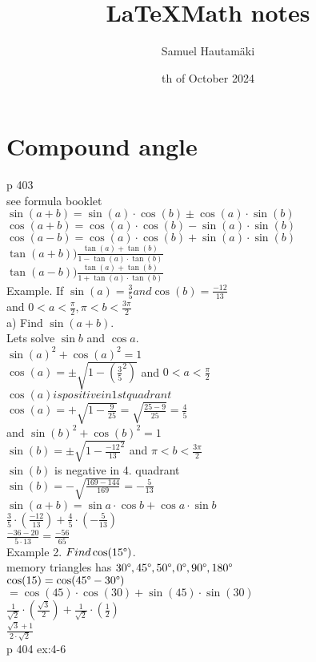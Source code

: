\documentclass{article}
\title{\LaTeX Math notes}
\author{Samuel Hautamäki}
\date{th of October 2024}
\begin{document}
  \maketitle
   
  \section{Compound angle}
  p 403\\
  see formula booklet\\
  $\sin (a+b)=\sin (a)\cdot\cos (b)\pm\cos(a)\cdot\sin(b)$\\
  $\cos (a+b)=\cos (a)\cdot\cos(b)-\sin(a)\cdot\sin(b)$\\
  $\cos (a-b)=\cos (a)\cdot\cos(b)+\sin(a)\cdot\sin(b)$\\
  $\tan(a+b)) \frac{\tan(a)+\tan(b)}{1-\tan(a)\cdot\tan(b)}$\\
  $\tan(a-b)) \frac{\tan(a)+\tan(b)}{1+\tan(a)\cdot\tan(b)}$\\
  Example. If $\sin(a)=\frac{3}{5} and \cos(b)=\frac{-12}{13}$\\
  and $0<a<\frac{\pi}{2},\pi<b<\frac{3\pi}{2}$\\
  a) Find $\sin(a+b)$.\\
  Lets solve $\sin b$ and $\cos a$.\\
  $\sin(a)^2+\cos(a)^2=1$\\
  $\cos(a)=\pm\sqrt{1-(\frac{3}{5}^2)}$ and $0<a<\frac{\pi}{2}$\\
  $\cos(a) is positive in 1st quadrant$\\
  $\cos(a)=+\sqrt{1-\frac{9}{25}}=\sqrt{\frac{25-9}{25}}=\frac{4}{5}$\\
  and $\sin(b)^2+\cos(b)^2=1$\\
  $\sin(b)=\pm\sqrt{1-\frac{-12}{13}^2}$ and $\pi<b<\frac{3\pi}{2}$\\
  $\sin(b)$ is negative in 4. quadrant\\
  $\sin(b)=-\sqrt{\frac{169-144}{169}}=-\frac{5}{13}$\\
  $\sin(a+b)=\sin a\cdot\cos b+\cos a\cdot\sin b$\\
  $\frac{3}{5}\cdot(\frac{-12}{13})+\frac{4}{5}\cdot(-\frac{5}{13})$\\
  $\frac{-36-20}{5\cdot13}=\frac{-56}{65}$\\
  Example 2. $Find \cos(15\degree)$.\\
  memory triangles has $30\degree,45\degree,50\degree,0\degree,90\degree,180\degree$\\
  $\cos(15)=\cos(45\degree-30\degree)$\\
  $=\cos(45)\cdot\cos(30)+\sin(45)\cdot\sin(30)$\\
  $\frac{1}{\sqrt{2}}\cdot(\frac{\sqrt{3}}{2})+\frac{1}{\sqrt{2}}\cdot(\frac{1}{2})$\\
  $\frac{\sqrt{3}+1}{2\cdot\sqrt{2}}$\\
  p 404 ex:4-6\\
\end{document}
